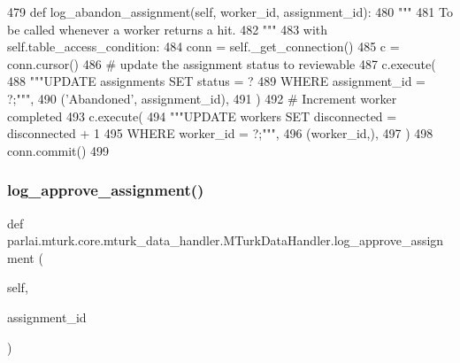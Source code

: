 \begin{DoxyCode}
479     \textcolor{keyword}{def }log\_abandon\_assignment(self, worker\_id, assignment\_id):
480         \textcolor{stringliteral}{"""}
481 \textcolor{stringliteral}{        To be called whenever a worker returns a hit.}
482 \textcolor{stringliteral}{        """}
483         with self.table\_access\_condition:
484             conn = self.\_get\_connection()
485             c = conn.cursor()
486             \textcolor{comment}{# update the assignment status to reviewable}
487             c.execute(
488                 \textcolor{stringliteral}{"""UPDATE assignments SET status = ?}
489 \textcolor{stringliteral}{                         WHERE assignment\_id = ?;"""},
490                 (\textcolor{stringliteral}{'Abandoned'}, assignment\_id),
491             )
492             \textcolor{comment}{# Increment worker completed}
493             c.execute(
494                 \textcolor{stringliteral}{"""UPDATE workers SET disconnected = disconnected + 1}
495 \textcolor{stringliteral}{                         WHERE worker\_id = ?;"""},
496                 (worker\_id,),
497             )
498             conn.commit()
499 
\end{DoxyCode}
\mbox{\label{classparlai_1_1mturk_1_1core_1_1mturk__data__handler_1_1MTurkDataHandler_adfbc9d075e9c0ffe22fc203676ad0a77}} 
\subsubsection{\texorpdfstring{log\+\_\+approve\+\_\+assignment()}{log\_approve\_assignment()}}
{\footnotesize\ttfamily def parlai.\+mturk.\+core.\+mturk\+\_\+data\+\_\+handler.\+M\+Turk\+Data\+Handler.\+log\+\_\+approve\+\_\+assignment (\begin{DoxyParamCaption}\item[{}]{self,  }\item[{}]{assignment\+\_\+id }\end{DoxyParamCaption})}

